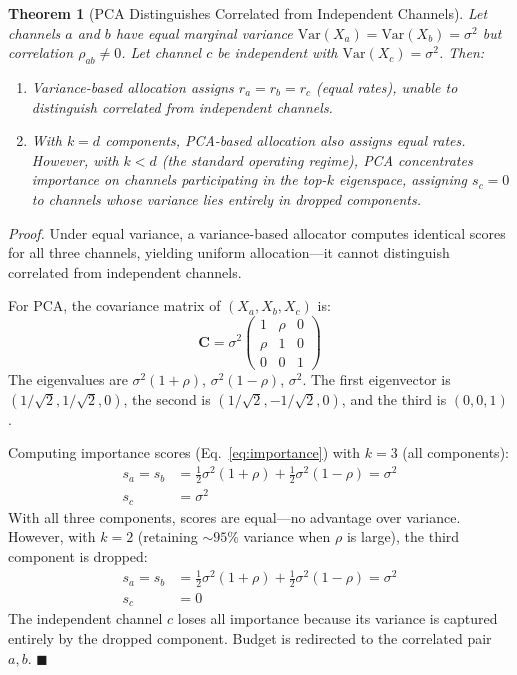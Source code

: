 \documentclass[journal]{IEEEtran}
\newtheorem{theorem}{Theorem}
\renewenvironment{proof}[1][Proof]{\noindent\textit{#1.}\space}{\hfill$\blacksquare$\par\medskip}
\begin{document}
\begin{theorem}[PCA Distinguishes Correlated from Independent Channels]
\label{thm:correlation}
Let channels $a$ and $b$ have equal marginal variance $\text{Var}(X_a) = \text{Var}(X_b) = \sigma^2$ but correlation $\rho_{ab} \neq 0$. Let channel $c$ be independent with $\text{Var}(X_c) = \sigma^2$. Then:
\begin{enumerate}[leftmargin=*]
\item Variance-based allocation assigns $r_a = r_b = r_c$ (equal rates), unable to distinguish correlated from independent channels.
\item With $k = d$ components, PCA-based allocation also assigns equal rates. However, with $k < d$ (the standard operating regime), PCA concentrates importance on channels participating in the top-$k$ eigenspace, assigning $s_c = 0$ to channels whose variance lies entirely in dropped components.
\end{enumerate}
\end{theorem}

\begin{proof}
Under equal variance, a variance-based allocator computes identical scores for all three channels, yielding uniform allocation---it cannot distinguish correlated from independent channels.

For PCA, the covariance matrix of $(X_a, X_b, X_c)$ is:
\begin{equation}
\mathbf{C} = \sigma^2 \begin{pmatrix} 1 & \rho & 0 \\ \rho & 1 & 0 \\ 0 & 0 & 1 \end{pmatrix}
\end{equation}
The eigenvalues are $\sigma^2(1+\rho)$, $\sigma^2(1-\rho)$, $\sigma^2$. The first eigenvector is $(1/\sqrt{2}, 1/\sqrt{2}, 0)$, the second is $(1/\sqrt{2}, -1/\sqrt{2}, 0)$, and the third is $(0, 0, 1)$.

Computing importance scores (Eq.~\ref{eq:importance}) with $k=3$ (all components):
\begin{align}
s_a = s_b &= \tfrac{1}{2}\sigma^2(1+\rho) + \tfrac{1}{2}\sigma^2(1-\rho) = \sigma^2 \\
s_c &= \sigma^2
\end{align}
With all three components, scores are equal---no advantage over variance. However, with $k=2$ (retaining ${\sim}95\%$ variance when $\rho$ is large), the third component is dropped:
\begin{align}
s_a = s_b &= \tfrac{1}{2}\sigma^2(1+\rho) + \tfrac{1}{2}\sigma^2(1-\rho) = \sigma^2 \\
s_c &= 0
\end{align}
The independent channel $c$ loses all importance because its variance is captured entirely by the dropped component. Budget is redirected to the correlated pair $a, b$.
\end{proof}
\end{document}
